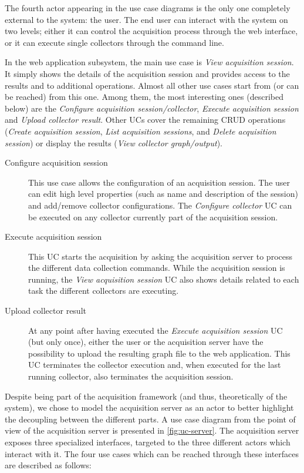 The fourth actor appearing in the use case diagrams is the only one completely external to the system: the user. The end user can interact with the system on two levels; either it can control the acquisition process through the web interface, or it can execute single collectors through the command line.

In the web application subsystem, the main use case is \emph{View acquisition session}. It simply shows the details of the acquisition session and provides access to the results and to additional operations. Almost all other use cases start from (or can be reached) from this one. Among them, the most interesting ones (described below) are the \emph{Configure acquisition session/collector}, \emph{Execute acquisition session} and \emph{Upload collector result}. Other UCs cover the remaining CRUD operations (\emph{Create acquisition session}, \emph{List acquisition sessions}, and \emph{Delete acquisition session}) or display the results (\emph{View collector graph/output}).

\begin{description}
  \item[Configure acquisition session] This use case allows the configuration of an acquisition session. The user can edit high level properties (such as name and description of the session) and add/remove collector configurations. The \emph{Configure collector} UC can be executed on any collector currently part of the acquisition session.
  \item[Execute acquisition session] This UC starts the acquisition by asking the acquisition server to process the different data collection commands. While the acquisition session is running, the \emph{View acquisition session} UC also shows details related to each task the different collectors are executing.
  \item[Upload collector result] At any point after having executed the \emph{Execute acquisition session} UC (but only once), either the user or the acquisition server have the possibility to upload the resulting graph file to the web application. This UC terminates the collector execution and, when executed for the last running collector, also terminates the acquisition session.
\end{description}

Despite being part of the acquisition framework (and thus, theoretically of the system), we chose to model the acquisition server as an actor to better highlight the decoupling between the different parts. A use case diagram from the point of view of the acquisition server is presented in \vref{fig:uc-server}. The acquisition server exposes three specialized interfaces, targeted to the three different actors which interact with it. The four use cases which can be reached through these interfaces are described as follows:

